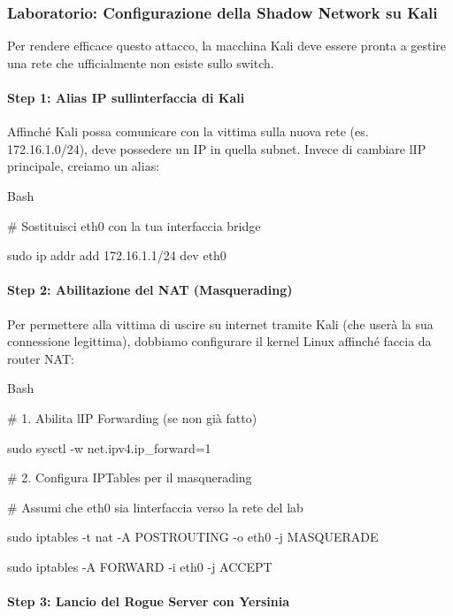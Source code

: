 \documentclass[11pt,a4paper]{article}
\begin{document}
\subsubsection{Laboratorio: Configurazione della Shadow Network su
Kali}\label{laboratorio-configurazione-della-shadow-network-su-kali}

Per rendere efficace questo attacco, la macchina Kali deve essere pronta
a gestire una rete che ufficialmente non esiste sullo switch.

\paragraph{Step 1: Alias IP sull\textquotesingle interfaccia di
Kali}\label{step-1-alias-ip-sullinterfaccia-di-kali}

Affinché Kali possa comunicare con la vittima sulla nuova rete (es.
172.16.1.0/24), deve possedere un IP in quella subnet. Invece di
cambiare l\textquotesingle IP principale, creiamo un alias:

Bash

\# Sostituisci eth0 con la tua interfaccia bridge

sudo ip addr add 172.16.1.1/24 dev eth0

\paragraph{Step 2: Abilitazione del NAT
(Masquerading)}\label{step-2-abilitazione-del-nat-masquerading}

Per permettere alla vittima di uscire su internet tramite Kali (che
userà la sua connessione legittima), dobbiamo configurare il kernel
Linux affinché faccia da router NAT:

Bash

\# 1. Abilita l\textquotesingle IP Forwarding (se non già fatto)

sudo sysctl -w net.ipv4.ip\_forward=1

\# 2. Configura IPTables per il masquerading

\# Assumi che eth0 sia l\textquotesingle interfaccia verso la rete del
lab

sudo iptables -t nat -A POSTROUTING -o eth0 -j MASQUERADE

sudo iptables -A FORWARD -i eth0 -j ACCEPT

\paragraph{Step 3: Lancio del Rogue Server con
Yersinia}\label{step-3-lancio-del-rogue-server-con-yersinia}
\end{document}
